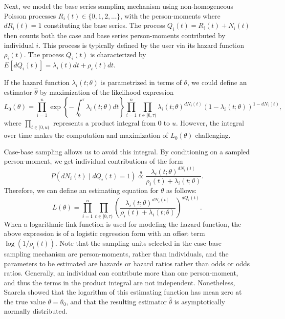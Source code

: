 \documentclass[
]{jss}
\begin{document}
Next, we model the base series sampling mechanism using non-homogeneous
Poisson processes \(R_i(t) \in \{0, 1, 2, \ldots\}\), with the
person-moments where \(dR_i(t) = 1\) constituting the base series. The
process \(Q_{i}(t) = R_i(t) + N_{i}(t)\) then counts both the case and
base series person-moments contributed by individual \(i\). This process
is typically defined by the user via its hazard function \(\rho_i(t)\).
The process \(Q_{i}(t)\) is characterized by
\(E[dQ_{i}(t)] = \lambda_{i}(t)dt + \rho_i(t)dt\).

If the hazard function \(\lambda_{i}(t; \theta)\) is parametrized in
terms of \(\theta\), we could define an estimator \(\hat{\theta}\) by
maximization of the likelihood expression
\[L_0(\theta) = \prod_{i=1}^n \exp\left\{ -\int_0^\tau \lambda_i(t; \theta) dt \right\} \prod_{i=1}^{n} \prod_{t\in[0,\tau)} \lambda_{i}(t;\theta)^{dN_{i}(t)}\left(1 - \lambda_{i}(t;\theta)\right)^{1 - dN_{i}(t)},\]
where \(\prod_{t\in[0,u)}\) represents a product integral from \(0\) to
\(u\). However, the integral over time makes the computation and
maximization of \(L_0(\theta)\) challenging.

Case-base sampling allows us to avoid this integral. By conditioning on
a sampled person-moment, we get individual contributions of the form
\[P(dN_{i}(t) \mid dQ_{i}(t) = 1) \stackrel{\theta}{\propto} \frac{\lambda_{i}(t; \theta)^{dN_{i}(t)}}{\rho_i(t) + \lambda_{i}(t;\theta)}.\]
Therefore, we can define an estimating equation for \(\theta\) as
follows:
\[L(\theta) = \prod_{i=1}^{n} \prod_{t\in[0,\tau)} \left(\frac{\lambda_{i}(t; \theta)^{dN_{i}(t)}}{\rho_i(t) + \lambda_{i}(t;\theta)}\right)^{dQ_i(t)}.\]
When a logarithmic link function is used for modeling the hazard
function, the above expression is of a logistic regression form with an
offset term \(\log(1/\rho_i(t))\). Note that the sampling units selected
in the case-base sampling mechanism are person-moments, rather than
individuals, and the parameters to be estimated are hazards or hazard
ratios rather than odds or odds ratios. Generally, an individual can
contribute more than one person-moment, and thus the terms in the
product integral are not independent. Nonetheless, Saarela
\citeyearpar{saarela2016case} showed that the logarithm of this
estimating function has mean zero at the true value \(\theta=\theta_0\),
and that the resulting estimator \(\hat{\theta}\) is asymptotically
normally distributed.
\end{document}
